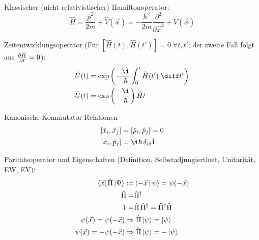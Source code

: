 \documentclass[11pt]{article}
\DeclareMathOperator*{\SumInt}{%
\mathchoice%
  {\ooalign{$\displaystyle\sum$\cr\hidewidth$\displaystyle\int$\hidewidth\cr}}
  {\ooalign{\raisebox{.14\height}{\scalebox{.7}{$\textstyle\sum$}}\cr\hidewidth$\textstyle\int$\hidewidth\cr}}
  {\ooalign{\raisebox{.2\height}{\scalebox{.6}{$\scriptstyle\sum$}}\cr$\scriptstyle\int$\cr}}
  {\ooalign{\raisebox{.2\height}{\scalebox{.6}{$\scriptstyle\sum$}}\cr$\scriptstyle\int$\cr}}
}
\numberwithin{equation}{section}
\begin{document}
			\noindent
			Klassischer (nicht relativistischer) Hamiltonoperator:
			\begin{equation}
				\hat{H} = \frac{\hat{p}^2}{2m}+\hat{V}(\vec{x}) = -\frac{\hbar^2}{2m}\frac{\partial^2}{\partial \vec{x}^2} + V(\vec{x})
			\end{equation}

			\noindent
			Zeitentwicklungsoperator (Für $\left[\hat{H}(t),\hat{H}(t')\right] = 0\;\forall t,t'$; der zweite Fall folgt aus $\frac{\partial \hat{H}}{\partial t}=0$):
			\begin{equation}
				\begin{aligned}
					\hat{U}(t) &= \exp{\left(-\frac{\i}{\hbar}\int_0^t \hat{H}(t')\;\diff t'\right)} \\
					\hat{U}(t) &= \exp{\left(-\frac{\i}{\hbar}\right)\hat{H} t} \\
				\end{aligned}
			\end{equation}

			\noindent
			Kanonische Kommutator-Relationen
			\begin{equation}
				\begin{aligned}
					\left[ \hat{x}_i, \hat{x}_j \right] &= \left[ \hat{p}_i, \hat{p}_j \right] = 0 \\
					\left[ \hat{x}_i, \hat{p}_j \right] &= \i\hbar\, \delta_{ij}\hat{1} \\
				\end{aligned}
			\end{equation}

			\noindent
			Paritätsoperator und Eigenschaften (Definition, Selbstadjungiertheit, Unitarität, EW, EV):
			\begin{equation}
				\begin{aligned}
					\Bra{\vec{x}} \hat{\Pi} \Ket{\Psi} :=& \Braket{-\vec{x} | \psi} = \psi(-\vec{x}) \\
					\hat{\Pi} =& \hat{\Pi}^\dagger\\
					1 =& \hat{\Pi} \,\hat{\Pi}^\dagger = \hat{\Pi}^\dagger \hat{\Pi} \\
					\psi(\vec{x}) = \psi(-\vec{x}) \Rightarrow&\; \hat{\Pi}\Ket{\psi} = \Ket{\psi} \\
					\psi(\vec{x}) = -\psi(-\vec{x}) \Rightarrow&\; \hat{\Pi}\Ket{\psi} = -\Ket{\psi} \\
				\end{aligned}
			\end{equation}
\end{document}
